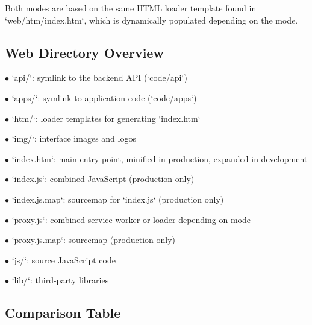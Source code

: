 \documentclass[a4paper]{article}
\begin{document}
Both modes are based on the same HTML loader template found in `web/htm/index.htm`, which is dynamically populated depending on the mode.

\hypertarget{toc29}{}
\subsection*{Web Directory Overview}

\begin{compactitem}
\item[\color{myblue}$\bullet$] `api/`: symlink to the backend API (`code/api`)
\item[\color{myblue}$\bullet$] `apps/`: symlink to application code (`code/apps`)
\item[\color{myblue}$\bullet$] `htm/`: loader templates for generating `index.htm`
\item[\color{myblue}$\bullet$] `img/`: interface images and logos
\item[\color{myblue}$\bullet$] `index.htm`: main entry point, minified in production, expanded in development
\item[\color{myblue}$\bullet$] `index.js`: combined JavaScript (production only)
\item[\color{myblue}$\bullet$] `index.js.map`: sourcemap for `index.js` (production only)
\item[\color{myblue}$\bullet$] `proxy.js`: combined service worker or loader depending on mode
\item[\color{myblue}$\bullet$] `proxy.js.map`: sourcemap (production only)
\item[\color{myblue}$\bullet$] `js/`: source JavaScript code
\item[\color{myblue}$\bullet$] `lib/`: third-party libraries
\end{compactitem}

\hypertarget{toc30}{}
\subsection*{Comparison Table}
\end{document}
